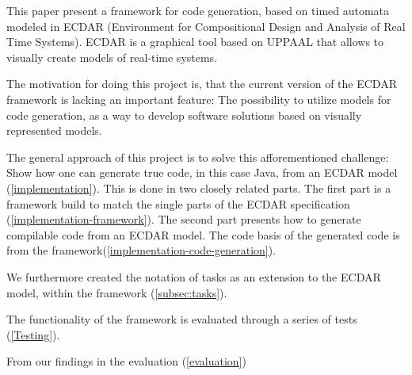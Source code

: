 This paper present a framework for code generation, based on timed automata modeled in ECDAR (Environment for Compositional Design and Analysis of Real Time Systems). ECDAR is a graphical tool based on UPPAAL that allows to visually create models of real-time systems.

The motivation for doing this project is, that the current version of the ECDAR framework is lacking an important feature: The possibility to utilize models for code generation, as a way to develop software solutions based on visually represented models.

The general approach of this project is to solve this afforementioned challenge: Show how one can generate true code, in this case Java, from an ECDAR model (\ref{implementation}). This is done in two closely related parts. The first part is a framework build to match the single parts of the ECDAR specification (\ref{implementation-framework}). The second part presents how to generate compilable code from an ECDAR model. The code basis of the generated code is from the framework(\ref{implementation-code-generation}). 

We furthermore created the notation of tasks as an extension to the ECDAR model, within the framework (\ref{subsec:tasks}). 

The functionality of the framework is evaluated through a series of tests (\ref{Testing}). 

From our findings in the evaluation (\ref{evaluation}) 
